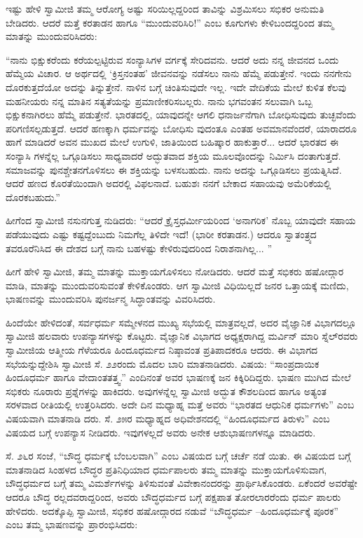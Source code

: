 ಇಷ್ಟು ಹೇಳಿ ಸ್ವಾಮೀಜಿ ತಮ್ಮ ಆರೋಗ್ಯ ಅಷ್ಟು ಸರಿಯಿಲ್ಲದ್ದರಿಂದ ತಾವಿನ್ನು ವಿಶ್ರಮಿಸಲು ಸಭಿಕರ ಅನುಮತಿ ಬೇಡಿದರು. ಆದರೆ ಮತ್ತೆ ಕರತಾಡನ ಹಾಗೂ “ಮುಂದುವರಿಸಿರಿ!” ಎಂಬ ಕೂಗುಗಳು ಕೇಳಿಬಂದದ್ದರಿಂದ ತಮ್ಮ ಮಾತನ್ನು ಮುಂದುವರಿಸಿದರು:

“ನಾನು ಭಿಕ್ಷುಕರೆಂದು ಕರೆಯಲ್ಪಟ್ಟಿರುವ ಸಂನ್ಯಾಸಿಗಳ ವರ್ಗಕ್ಕೆ ಸೇರಿದವನು. ಆದರೆ ಅದು ನನ್ನ ಜೀವನದ ಒಂದು ಹೆಮ್ಮೆಯ ವಿಚಾರ. ಆ ಅರ್ಥದಲ್ಲಿ ‘ಕ್ರಿಸ್ತನಂತಹ’ ಜೀವನವನ್ನು ನಡೆಸಲು ನಾನು ಹೆಮ್ಮೆ ಪಡುತ್ತೇನೆ. ಇಂದು ನನಗೇನು ದೊರಕುತ್ತದೆಯೋ ಅದನ್ನು ತಿನ್ನುತ್ತೇನೆ. ನಾಳಿನ ಬಗ್ಗೆ ಚಿಂತಿಸುವುದೇ ಇಲ್ಲ. ಇದೇ ವೇದಿಕೆಯ ಮೇಲೆ ಕುಳಿತ ಕೆಲವು ಮಹನೀಯರು ನನ್ನ ಮಾತಿನ ಸತ್ಯತೆಯನ್ನು ಪ್ರಮಾಣೀಕರಿಸಬಲ್ಲರು. ನಾನು ಭಗವಂತನ ಸಲುವಾಗಿ ಒಬ್ಬ ಭಿಕ್ಷುಕನಾಗಿರಲು ಹೆಮ್ಮೆ ಪಡುತ್ತೇನೆ. ಭಾರತದಲ್ಲಿ, ಯಾವುದನ್ನೇ ಆಗಲಿ ಧನಾರ್ಜನೆಗಾಗಿ ಬೋಧಿಸುವುದು ತುಚ್ಛವೆಂದು ಪರಿಗಣಿಸಲ್ಪಡುತ್ತದೆ. ಆದರೆ ಹಣಕ್ಕಾಗಿ ಧರ್ಮವನ್ನು ಬೋಧಿಸು ವುದಂತೂ ಎಂತಹ ಅವಮಾನವೆಂದರೆ, ಯಾರಾದರೂ ಹಾಗೆ ಮಾಡಿದರೆ ಅವನ ಮುಖದ ಮೇಲೆ ಉಗುಳಿ, ಜಾತಿಯಿಂದ ಬಹಿಷ್ಕಾರ ಹಾಕುತ್ತಾರೆ... ಆದರೆ ಭಾರತದ ಈ ಸಂನ್ಯಾಸಿ ಗಳನ್ನೆಲ್ಲ ಒಗ್ಗೂಡಿಸಲು ಸಾಧ್ಯವಾದರೆ ಅದ್ಭುತವಾದ ಶಕ್ತಿಯ ಮೂಲವೊಂದನ್ನು ನಿರ್ಮಿಸಿ ದಂತಾಗುತ್ತದೆ. ಸಮಾಜವನ್ನು ಪುನಶ್ಚೇತನಗೊಳಿಸಲು ಈ ಶಕ್ತಿಯನ್ನು ಬಳಸಬಹುದು. ನಾನು ಅದನ್ನು ಒಗ್ಗೂಡಿಸಲು ಪ್ರಯತ್ನಿಸಿದೆ. ಆದರೆ ಹಣದ ಕೊರತೆಯಿಂದಾಗಿ ಅದರಲ್ಲಿ ವಿಫಲನಾದೆ. ಬಹುಶಃ ನನಗೆ ಬೇಕಾದ ಸಹಾಯವು ಅಮೆರಿಕೆಯಲ್ಲಿ ದೊರಕಬಹುದು.”

ಹೀಗೆಂದ ಸ್ವಾಮೀಜಿ ನಸುನಗುತ್ತ ನುಡಿದರು: “ಆದರೆ ಕ್ರೈಸ್ತಧರ್ಮೀಯರಿಂದ ‘ಅನಾಗರಿಕ’ ನೊಬ್ಬ ಯಾವುದೇ ಸಹಾಯ ಪಡೆಯುವುದು ಎಷ್ಟು ಕಷ್ಟದ್ದೆಂಬುದು ನಿಮಗೆಲ್ಲ ತಿಳಿದೇ ಇದೆ! (ಭಾರೀ ಕರತಾಡನ.) ಆದರೂ ಸ್ವಾತಂತ್ರ್ಯದ ತವರೂರೆನಿಸಿದ ಈ ದೇಶದ ಬಗ್ಗೆ ನಾನು ಬಹಳಷ್ಟು ಕೇಳಿರುವುದರಿಂದ ನಿರಾಶನಾಗಿಲ್ಲ... ”

ಹೀಗೆ ಹೇಳಿ ಸ್ವಾಮೀಜಿ, ತಮ್ಮ ಮಾತನ್ನು ಮುಕ್ತಾಯಗೊಳಿಸಲು ನೋಡಿದರು. ಆದರೆ ಮತ್ತೆ ಸಭಿಕರು ಹಷೋದ್ಗಾರ ಮಾಡಿ, ಮಾತನ್ನು ಮುಂದುವರಿಸುವಂತೆ ಕೇಳಿಕೊಂಡರು. ಆಗ ಸ್ವಾಮೀಜಿ ವಿಧಿಯಿಲ್ಲದೆ ಜನರ ಒತ್ತಾಯಕ್ಕೆ ಮಣಿದು, ಭಾಷಣವನ್ನು ಮುಂದುವರಿಸಿ ಪುನರ್ಜನ್ಮ ಸಿದ್ಧಾಂತವನ್ನು ವಿವರಿಸಿದರು.

ಹಿಂದೆಯೇ ಹೇಳಿದಂತೆ, ಸರ್ವಧರ್ಮ ಸಮ್ಮೇಳನದ ಮುಖ್ಯ ಸಭೆಯಲ್ಲಿ ಮಾತ್ರವಲ್ಲದೆ, ಅದರ ವೈಜ್ಞಾನಿಕ ವಿಭಾಗದಲ್ಲೂ ಸ್ವಾಮೀಜಿ ಹಲವಾರು ಉಪನ್ಯಾಸಗಳನ್ನು ಕೊಟ್ಟರು. ವೈಜ್ಞಾನಿಕ ವಿಭಾಗದ ಅಧ್ಯಕ್ಷರಾಗಿದ್ದ ಮರ್ವಿನ್ ಮಾರಿ ಸ್ನೆಲ್​ರವರು ಸ್ವಾಮೀಜಿಯ ಆತ್ಮೀಯ ಗೆಳೆಯರೂ ಹಿಂದೂಧರ್ಮದ ನಿಷ್ಠಾವಂತ ಪ್ರತಿಪಾದಕರೂ ಆದರು. ಈ ವಿಭಾಗದ ಸಭೆಯನ್ನುದ್ದೇಶಿಸಿ ಸ್ವಾಮೀಜಿ ಸೆ. ೨೨ರಂದು ಮೊದಲ ಬಾರಿ ಮಾತನಾಡಿದರು. ವಿಷಯ: “ಸಾಂಪ್ರದಾಯಿಕ ಹಿಂದೂಧರ್ಮ ಹಾಗೂ ವೇದಾಂತತತ್ತ್ವ.” ಎಂದಿನಂತೆ ಅವರ ಭಾಷಣಕ್ಕೆ ಜನ ಕಿಕ್ಕಿರಿದಿದ್ದರು. ಭಾಷಣ ಮುಗಿದ ಮೇಲೆ ಸಭಿಕರು ನೂರಾರು ಪ್ರಶ್ನೆಗಳನ್ನು ಹಾಕಿದರು. ಅವುಗಳನ್ನೆಲ್ಲ ಸ್ವಾಮೀಜಿ ಅದ್ಭುತ ಕೌಶಲದಿಂದ ಹಾಗೂ ಅತ್ಯಂತ ಸರಳವಾದ ರೀತಿಯಲ್ಲಿ ಉತ್ತರಿಸಿದರು. ಅದೇ ದಿನ ಮಧ್ಯಾಹ್ನ ಮತ್ತೆ ಅವರು “ಭಾರತದ ಆಧುನಿಕ ಧರ್ಮಗಳು” ಎಂಬ ವಿಷಯವಾಗಿ ಮಾತನಾಡಿ ದರು. ಸೆ. ೨೫ರ ಮಧ್ಯಾಹ್ನದ ಅಧಿವೇಶನದಲ್ಲಿ “ಹಿಂದೂಧರ್ಮದ ತಿರುಳು” ಎಂಬ ವಿಷಯದ ಬಗ್ಗೆ ಉಪನ್ಯಾಸ ನೀಡಿದರು. ಇವುಗಳಲ್ಲದೆ ಅವರು ಅನೇಕ ಆಶುಭಾಷಣಗಳನ್ನೂ ಮಾಡಿದರು.

ಸೆ. ೨೬ರ ಸಂಜೆ, “ಬೌದ್ಧ ಧರ್ಮಕ್ಕೆ ಬೆಂಬಲವಾಗಿ” ಎಂಬ ವಿಷಯದ ಬಗ್ಗೆ ಚರ್ಚೆ ನಡೆ ಯಿತು. ಈ ವಿಷಯದ ಬಗ್ಗೆ ಮಾತನಾಡಿದ ಸಿಂಹಳದ ಬೌದ್ಧರ ಪ್ರತಿನಿಧಿಯಾದ ಧರ್ಮಪಾಲರು ತಮ್ಮ ಮಾತನ್ನು ಮುಕ್ತಾಯಗೊಳಿಸುವಾಗ, ಬೌದ್ಧಧರ್ಮದ ಬಗ್ಗೆ ತಮ್ಮ ವಿಮರ್ಶೆಗಳನ್ನು ತಿಳಿಸುವಂತೆ ವಿವೇಕಾನಂದರನ್ನು ಪ್ರಾರ್ಥಿಸಿಕೊಂಡರು. ಏಕೆಂದರೆ ಅವರೆಷ್ಟೇ ಆದರೂ ಬೌದ್ಧ ರಲ್ಲದವರಾದ್ದರಿಂದ, ಅವರು ಬೌದ್ಧಧರ್ಮದ ಬಗ್ಗೆ ಪಕ್ಷಪಾತ ತೋರಲಾರರೆಂದು ಧರ್ಮ ಪಾಲರು ಹೇಳಿದರು. ಅದಕ್ಕೊಪ್ಪಿ ಸ್ವಾಮೀಜಿ, ಸಭಿಕರ ಹಷೋದ್ಗಾರದ ನಡುವೆ “ಬೌದ್ಧಧರ್ಮ –ಹಿಂದೂಧರ್ಮಕ್ಕೆ ಪೂರಕ” ಎಂಬ ತಮ್ಮ ಭಾಷಣವನ್ನು ಪ್ರಾರಂಭಿಸಿದರು:

